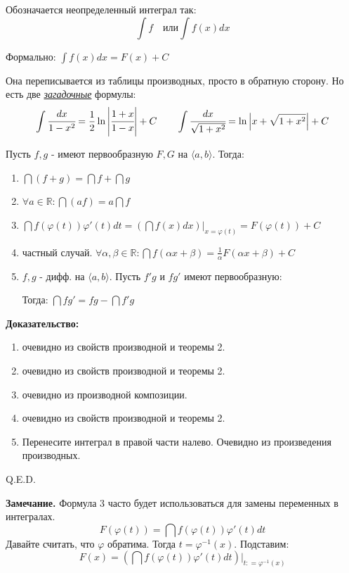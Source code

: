 Обозначается неопределенный интеграл так:
$$\int f \quad \text{или} \int f(x) dx $$

Формально: $\displaystyle \int f(x)dx = F(x) +C$


Она переписывается из таблицы производных, просто в обратную сторону. Но есть две \uline{\emph{загадочные}} формулы:
     $$\displaystyle \int \cfrac{dx}{1-x^2} = \frac{1}{2}\ln \left|\cfrac{1+x}{1-x}\right| + C \quad \quad \int \cfrac{dx}{\sqrt{1+x^2}} = \ln \left|x + \sqrt{1+x^2}\right| + C$$


Пусть $f,g$ - имеют первообразную $F,G$ на $\langle a,b \rangle$. Тогда:

\begin{enumerate}
    \item $\dint (f+g) = \dint f + \dint g$
    \item $\forall a \in \mathbb{R}: \dint (af)=a\dint f$
    \item $\dint f(\varphi(t))\varphi'(t)dt = \left(\dint f(x)dx\right)\Big |_{x=\varphi(t)}= F(\varphi(t)) + C$
    \item частный случай. $\forall \alpha,\beta \in \mathbb{R}:\dint f(\alpha x + \beta) = \frac{1}{\alpha}F(\alpha x+\beta) + C$
    \item $f,g$ - дифф. на $\langle a,b\rangle$. Пусть $f'g$ и $fg'$ имеют первообразную: 
    
    Тогда: $\dint f g' = fg -\dint f'g$
\end{enumerate}

\textbf{Доказательство:}
\begin{enumerate}
    \item очевидно из свойств производной и теоремы 2.
    \item очевидно из свойств производной и теоремы 2.
    \item очевидно из производной композиции.
    \item очевидно из свойств производной и теоремы 2.
    \item Перенесите интеграл в правой части налево. Очевидно из произведения производных.
\end{enumerate}
    \hfill Q.E.D.

\textbf{Замечание.} Формула 3 часто будет использоваться для замены переменных в интегралах.
$$F(\varphi(t)) = \dint f(\varphi(t))\varphi'(t)dt $$
Давайте считать, что $\varphi $ обратима. Тогда $t = \varphi^{-1}(x)$. Подставим:
$$F(x)=\left(\dint f(\varphi(t))\varphi'(t)dt\right)\Big|_{t: = \varphi^{-1}(x)} $$

